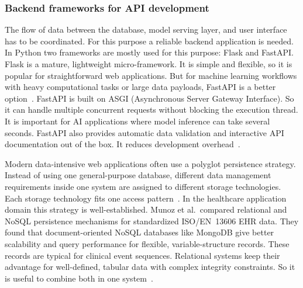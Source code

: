 \subsubsection{Backend frameworks for API development}
The flow of data between the database, model serving layer, and user interface has to be coordinated. For this purpose a reliable backend application is needed. In Python two frameworks are mostly used for this purpose: Flask and FastAPI. Flask is a mature, lightweight micro-framework. It is simple and flexible, so it is popular for straightforward web applications. But for machine learning workflows with heavy computational tasks or large data payloads, FastAPI is a better option~\cite{fastapi_vs_flask_2026}. FastAPI is built on ASGI (Asynchronous Server Gateway Interface). So it can handle multiple concurrent requests without blocking the execution thread. It is important for AI applications where model inference can take several seconds. FastAPI also provides automatic data validation and interactive API documentation out of the box. It reduces development overhead~\cite{fastapi_vs_flask_2026, geeks_fastapi_2024}.

Modern data-intensive web applications often use a polyglot persistence strategy. Instead of using one general-purpose database, different data management requirements inside one system are assigned to different storage technologies. Each storage technology fits one access pattern~\cite{khine2019polyglot}. In the healthcare application domain this strategy is well-established. Munoz et al.\ compared relational and NoSQL persistence mechanisms for standardized ISO/EN~13606 EHR data. They found that document-oriented NoSQL databases like MongoDB give better scalability and query performance for flexible, variable-structure records. These records are typical for clinical event sequences. Relational systems keep their advantage for well-defined, tabular data with complex integrity constraints. So it is useful to combine both in one system~\cite{munoz2017ehr}.

